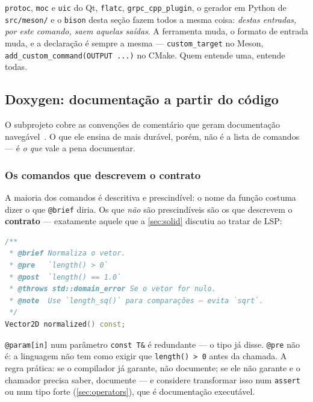 \begin{regra}
\texttt{protoc}, \texttt{moc} e \texttt{uic} do Qt, \texttt{flatc},
\texttt{grpc\_cpp\_plugin}, o gerador em Python de \texttt{src/meson/} e o
\texttt{bison} desta seção fazem todos a mesma coisa: \emph{destas entradas,
por este comando, saem aquelas saídas}. A ferramenta muda, o formato de entrada
muda, e a declaração é sempre a mesma --- \texttt{custom\_target} no Meson,
\texttt{add\_custom\_command(OUTPUT ...)} no CMake. Quem entende uma, entende
todas.
\end{regra}

\subsection{Doxygen: documentação a partir do código}
\label{sec:doxygen}

O subprojeto  cobre as convenções de comentário que geram
documentação navegável~\cite{doxygen}. O que ele ensina de mais durável, porém,
não é a lista de comandos --- é \emph{o que} vale a pena documentar.

\subsubsection{Os comandos que descrevem o contrato}

A maioria dos comandos é descritiva e prescindível: o nome da função costuma
dizer o que \texttt{@brief} diria. Os que \emph{não} são prescindíveis são os
que descrevem o \textbf{contrato} --- exatamente aquele que a
\cref{sec:solid} discutiu ao tratar de LSP:

\begin{lstlisting}[style=bt, language=C++,
    caption={Pré-condição, pós-condição e exceção: o que a assinatura não diz.}]
/**
 * @brief Normaliza o vetor.
 * @pre   `length() > 0`
 * @post  `length() == 1.0`
 * @throws std::domain_error Se o vetor for nulo.
 * @note  Use `length_sq()` para comparações — evita `sqrt`.
 */
Vector2D normalized() const;
\end{lstlisting}

\begin{regra}
\texttt{@param[in]} num parâmetro \texttt{const T\&} é redundante --- o tipo já
disse. \texttt{@pre} não é: a linguagem não tem como exigir que
\texttt{length() > 0} antes da chamada. A regra prática: se o compilador já
garante, não documente; se ele não garante e o chamador precisa saber, documente
--- e considere transformar isso num \texttt{assert} ou num tipo forte
(\cref{sec:operators}), que é documentação executável.
\end{regra}

